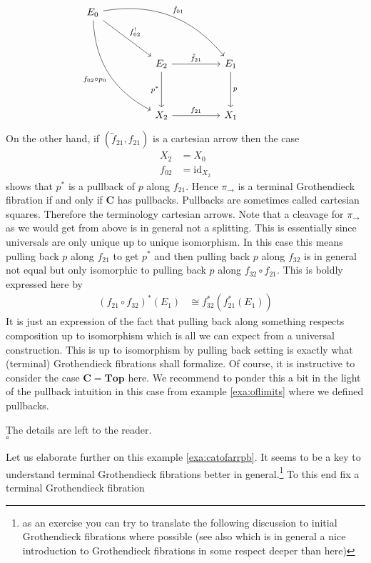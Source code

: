 \begin{exa}
\[\begin{tikzcd}[sep=huge]
  E_{0}
  \arrow[bend left=30]{drr}{\tilde{f}_{01}}
  \arrow{dr}{f_{02}^{!}}
  \arrow[swap,bend right=30]{ddr}{f_{02} \circ p_{0}}
  &
  &
  &
  \\
  &
  E_{2}
  \arrow{r}{\tilde{f}_{21}}
  \arrow[swap]{d}{p^{\ast}}
  &
  E_{1}
  \arrow{d}{p}
  \\
  &
  X_{2}
  \arrow{r}{f_{21}}
  &
  X_{1}
\end{tikzcd}
\]
On the other hand, if $(\tilde{f}_{21},f_{21})$ is a cartesian arrow then the case
\begin{align*}
  X_{2}
  &=
  X_{0}
  \\
  f_{02}
  &=
  \mathrm{id}_{X_{2}}
\end{align*}
shows that $p^{\ast}$ is a pullback of $p$ along $f_{21}$. Hence $\pi_{\rightarrow}$ is a terminal Grothendieck fibration if and only if $\mathbf{C}$ has pullbacks. Pullbacks are sometimes called cartesian squares. Therefore the terminology cartesian arrows. Note that a cleavage for $\pi_{\rightarrow}$ as we would get from above is in general not a splitting. This is essentially since universals are only unique up to unique isomorphism. In this case this means pulling back $p$ along $f_{21}$ to get $p^{\ast}$ and then pulling back $p$ along $f_{32}$ is in general not equal but only isomorphic to pulling back $p$ along $f_{32} \circ f_{21}$. This is boldly expressed here by
\begin{align*}
  \left(
    f_{21}
    \circ
    f_{32}
  \right)^{\ast}
  (E_{1})
  &\cong
  f_{32}^{\ast}
  \left(
    f_{21}^{\ast}(E_{1})
  \right)
\end{align*}
It is just an expression of the fact that pulling back along something respects composition up to isomorphism which is all we can expect from a universal construction. This {\glqq}is up to isomorphism by pulling back{\grqq} setting is exactly what (terminal) Grothendieck fibrations shall formalize. Of course, it is instructive to consider the case $\mathbf{C} = \mathbf{Top}$ here. We recommend to ponder this a bit in the light of the pullback intuition in this case from example \ref{exa:oflimits} where we defined pullbacks.
\end{exa}
\begin{prf}
The details are left to the reader.
\\
\phantom{proven}
\hfill
$\square$
\end{prf}
Let us elaborate further on this example \ref{exa:catofarrpb}. It seems to be a key to understand terminal Grothendieck fibrations better in general.\footnote{as an exercise you can try to translate the following discussion to initial Grothendieck fibrations where possible (see also \cite{ab8cfa22} which is in general a nice introduction to Grothendieck fibrations in some respect deeper than here)} To this end fix a terminal Grothendieck fibration
